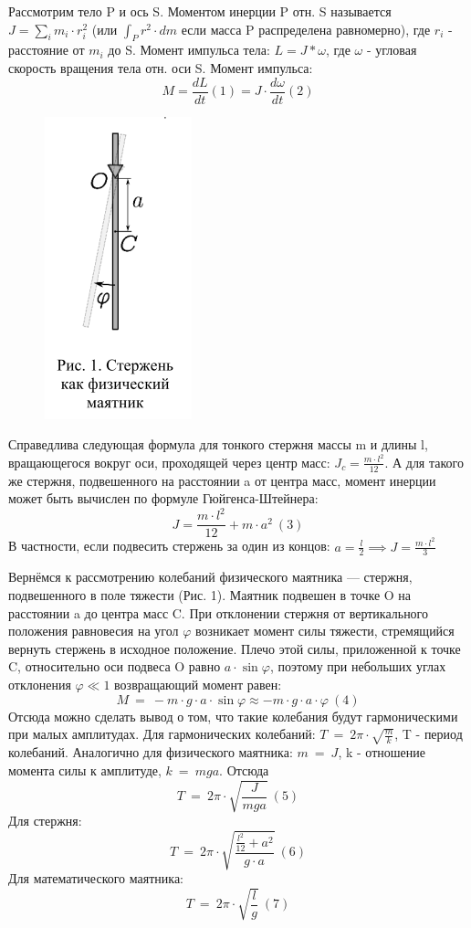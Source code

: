 \documentclass[a4paper,12pt]{article} %
\begin{document}
Рассмотрим тело P и ось S.
Моментом инерции P отн. S называется $J = \sum_i {m_i \cdot r_i^2}$ (или $\int_{P} {r^2 \cdot dm}$ если масса P распределена равномерно), где $r_i$ - расстояние от $m_i$ до S.
Момент импульса тела: $L = J*\omega$, где $\omega$ - угловая скорость вращения тела отн. оси S.
Момент импульса: \[M = \frac{dL}{dt} (1) = J \cdot \frac{d\omega}{dt} (2)\]

\begin{figure} [H]
\center
\includegraphics[scale=0.8]{data/pic1.png}
\end{figure}

Справедлива следующая формула для тонкого стержня массы m и длины l, вращающегося вокруг оси, проходящей через центр масс: $J_c = \frac{m \cdot l^2}{12}$.
А для такого же стержня, подвешенного на расстоянии a от центра масс, момент инерции может быть вычислен по формуле Гюйгенса-Штейнера: \[J = \frac{m \cdot l^2}{12} + m \cdot a^2 \ (3)\]
В частности, если подвесить стержень за один из концов: $a = \frac{l}{2} \implies J = \frac{m \cdot l^2}{3}$

Вернёмся к рассмотрению колебаний физического маятника — стержня, подвешенного в поле тяжести (Рис. 1). Маятник подвешен в точке O на расстоянии a до центра масс C. При отклонении стержня от вертикального положения равновесия на угол $\varphi$ возникает момент силы тяжести, стремящийся вернуть стержень в исходное положение. Плечо этой
силы, приложенной к точке C, относительно оси подвеса O равно $a \cdot \sin{\varphi}$,
поэтому при небольших углах отклонения $\varphi \ll 1$ возвращающий момент
равен: \[M\ =\ -m \cdot g \cdot a \cdot \sin{\varphi} \approx -m \cdot g \cdot a \cdot \varphi \ (4)\]
Отсюда можно сделать вывод о том, что такие колебания будут гармоническими при малых амплитудах.
Для гармонических колебаний: $T\ =\ 2\pi \cdot \sqrt{\frac{m}{k}}$, T - период колебаний.
Аналогично для физического маятника: $m\ =\ J$, k - отношение момента силы к амплитуде, $k\ =\ mga$. Отсюда \[T\ =\ 2\pi \cdot \sqrt{\frac{J}{mga}} \ (5)\]
Для стержня: \[T\ =\ 2\pi \cdot \sqrt{\frac{\frac{l^2}{12} + a^2}{g \cdot a}} \ (6)\]
Для математического маятника: \[T\ =\ 2\pi \cdot \sqrt{\frac{l}{g}} \ (7)\]
\end{document}
